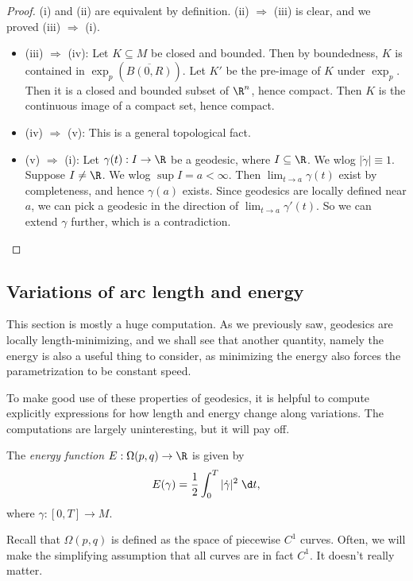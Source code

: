 \documentclass[a4paper]{article}
\begin{document}
\begin{proof}
  (i) and (ii) are equivalent by definition. (ii) $\Rightarrow$ (iii) is clear, and we proved (iii) $\Rightarrow$ (i).

  \begin{itemize}
    \item (iii) $\Rightarrow$ (iv): Let $K \subseteq M$ be closed and bounded. Then by boundedness, $K$ is contained in $\exp_p(\overline{B(0, R)})$. Let $K'$ be the pre-image of $K$ under $\exp_p$. Then it is a closed and bounded subset of $\R^n$, hence compact. Then $K$ is the continuous image of a compact set, hence compact.
    \item (iv) $\Rightarrow$ (v): This is a general topological fact.
    \item (v) $\Rightarrow$ (i): Let $\gamma(t): I \to \R$ be a geodesic, where $I \subseteq \R$. We wlog $|\dot{\gamma}| \equiv 1$. Suppose $I \not= \R$. We wlog $\sup I = a < \infty$. Then $\lim_{t \to a} \gamma(t)$ exist by completeness, and hence $\gamma(a)$ exists. Since geodesics are locally defined near $a$, we can pick a geodesic in the direction of $\lim_{t \to a} \gamma'(t)$. So we can extend $\gamma$ further, which is a contradiction.\qedhere
  \end{itemize}
\end{proof}

\subsection{Variations of arc length and energy}
This section is mostly a huge computation. As we previously saw, geodesics are locally length-minimizing, and we shall see that another quantity, namely the energy is also a useful thing to consider, as minimizing the energy also forces the parametrization to be constant speed.

To make good use of these properties of geodesics, it is helpful to compute explicitly expressions for how length and energy change along variations. The computations are largely uninteresting, but it will pay off.

\begin{defi}[Energy]
  The \emph{energy function} $E: \Omega(p, q) \to \R$ is given by
  \[
    E(\gamma) = \frac{1}{2} \int_0^T|\dot{\gamma}|^2\;\d t,
  \]
  where $\gamma: [0, T] \to M$.
\end{defi}
Recall that $\Omega(p, q)$ is defined as the space of piecewise $C^1$ curves. Often, we will make the simplifying assumption that all curves are in fact $C^1$. It doesn't really matter.
\end{document}

